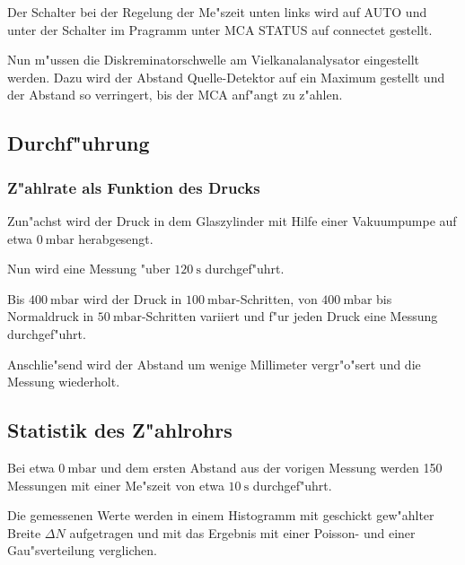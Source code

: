 	Der Schalter bei der Regelung der Me"szeit unten links wird auf AUTO  und unter der Schalter im Pragramm unter MCA STATUS 
	auf connectet gestellt.

	Nun m"ussen die Diskreminatorschwelle am Vielkanalanalysator eingestellt werden. Dazu wird der Abstand Quelle-Detektor auf ein Maximum gestellt und der Abstand so verringert, bis der MCA anf"angt zu z"ahlen.

	\subsection{Durchf"uhrung} %
	\label{sub:durchf_uhrung}
	

	\subsubsection{Z"ahlrate als Funktion des Drucks} %
	\label{sub:subsection_name}
	
	Zun"achst wird der Druck in dem Glaszylinder mit Hilfe einer Vakuumpumpe auf etwa $\SI{0}{\milli\bar}$ herabgesengt.

	Nun wird eine Messung "uber $\SI{120}{\second}$ durchgef"uhrt.

	Bis $\SI{400}{\milli\bar}$ wird der Druck in $\SI{100}{\milli\bar}$-Schritten, von $\SI{400}{\milli\bar}$ bis Normaldruck in $\SI{50}{\milli\bar}$-Schritten variiert und f"ur jeden Druck eine Messung durchgef"uhrt.

	Anschlie"send wird der Abstand um wenige Millimeter vergr"o"sert und die Messung wiederholt.

	\subsection{Statistik des Z"ahlrohrs} %
	\label{sub:statistik_des_z_ahlrohrs}
	
	Bei etwa $\SI{0}{\milli\bar}$ und dem ersten Abstand aus der vorigen Messung werden 150 Messungen mit einer Me"szeit von etwa $\SI{10}{\second}$ durchgef"uhrt.

	Die gemessenen Werte werden in einem Histogramm mit geschickt gew"ahlter Breite $\Delta N$ aufgetragen und mit das Ergebnis mit einer Poisson- und einer Gau"sverteilung verglichen.